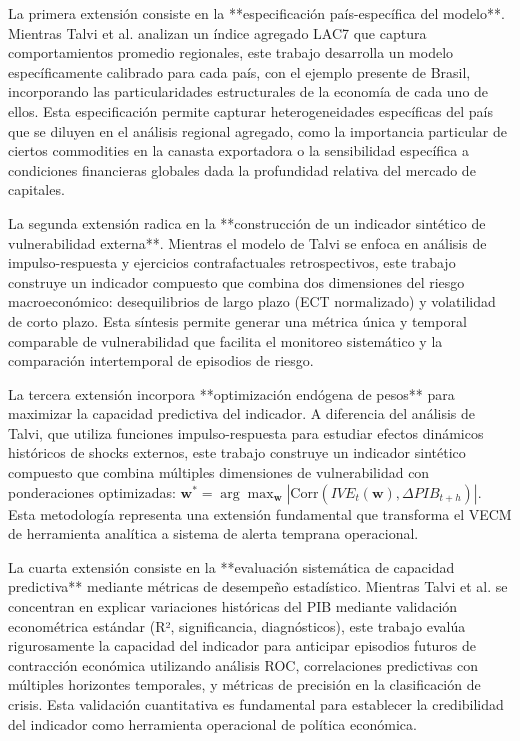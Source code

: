 \documentclass[3p,11pt]{elsarticle}
\begin{document}
La primera extensión consiste en la **especificación país-específica del modelo**. Mientras Talvi et al. analizan un índice agregado LAC7 que captura comportamientos promedio regionales, este trabajo desarrolla un modelo específicamente calibrado para cada país, con el ejemplo presente de Brasil, incorporando las particularidades estructurales de la economía de cada uno de ellos. Esta especificación permite capturar heterogeneidades específicas del país que se diluyen en el análisis regional agregado, como la importancia particular de ciertos commodities en la canasta exportadora o la sensibilidad específica a condiciones financieras globales dada la profundidad relativa del mercado de capitales.

La segunda extensión radica en la **construcción de un indicador sintético de vulnerabilidad externa**. Mientras el modelo de Talvi se enfoca en análisis de impulso-respuesta y ejercicios contrafactuales retrospectivos, este trabajo construye un indicador compuesto que combina dos dimensiones del riesgo macroeconómico: desequilibrios de largo plazo (ECT normalizado) y volatilidad de corto plazo. Esta síntesis permite generar una métrica única y temporal comparable de vulnerabilidad que facilita el monitoreo sistemático y la comparación intertemporal de episodios de riesgo.

La tercera extensión incorpora **optimización endógena de pesos** para maximizar la capacidad predictiva del indicador. A diferencia del análisis de Talvi, que utiliza funciones impulso-respuesta para estudiar efectos dinámicos históricos de shocks externos, este trabajo construye un indicador sintético compuesto que combina múltiples dimensiones de vulnerabilidad con ponderaciones optimizadas: $\mathbf{w}^* = \arg\max_{\mathbf{w}} |\text{Corr}(IVE_t(\mathbf{w}), \Delta PIB_{t+h})|$. Esta metodología representa una extensión fundamental que transforma el VECM de herramienta analítica a sistema de alerta temprana operacional.

La cuarta extensión consiste en la **evaluación sistemática de capacidad predictiva** mediante métricas de desempeño estadístico. Mientras Talvi et al. se concentran en explicar variaciones históricas del PIB mediante validación econométrica estándar (R², significancia, diagnósticos), este trabajo evalúa rigurosamente la capacidad del indicador para anticipar episodios futuros de contracción económica utilizando análisis ROC, correlaciones predictivas con múltiples horizontes temporales, y métricas de precisión en la clasificación de crisis. Esta validación cuantitativa es fundamental para establecer la credibilidad del indicador como herramienta operacional de política económica.
\end{document}
